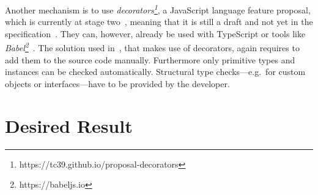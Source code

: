 Another mechanism is to use \textit{decorators\footnote{https://tc39.github.io/proposal-decorators}},
a JavaScript language feature proposal, which is currently at stage two~\cite{DecoratorsProposalRepo}, meaning that it is still a draft and not yet in the specification~\cite{EcmaScriptProposalProcess}. They can, however, already be used with TypeScript or tools like \emph{Babel\footnote{https://babeljs.io}}~\cite{TypeScriptHandbook:Decorators, Babel:Plugins:Decorators}.
The solution used in~\cite{DecoratorTypeChecks}, that makes use of decorators, again requires
to add them to the source code manually. Furthermore only primitive types and instances can be checked automatically. Structural type checks---e.g.\ for custom objects or interfaces---have
to be provided by the developer.




\section{Desired Result}
\label{sec:desired-result}

